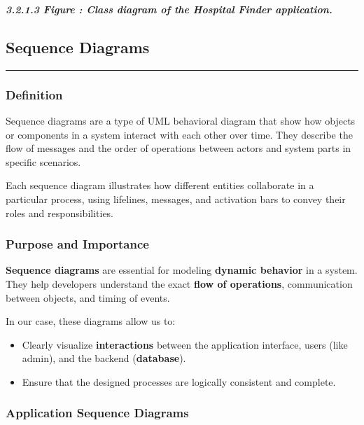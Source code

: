 \documentclass[12pt]{report}
\begin{document}
\vspace{0.5cm}
\begin{center}
	\textit{\textbf{3.2.1.3 Figure : Class diagram of the Hospital Finder application.}}

\end{center}
\vspace{0.5cm}
\subsection{Sequence Diagrams}
\vspace{-0.3cm}
\rule{7.2cm}{1.2pt}
\vspace{-0.3cm}

\subsubsection{Definition}
\vspace{0.1cm}

Sequence diagrams are a type of UML behavioral diagram that show how objects or components in a system interact with each other over time. They describe the flow of messages and the order of operations between actors and system parts in specific scenarios.

Each sequence diagram illustrates how different entities collaborate in a particular process, using lifelines, messages, and activation bars to convey their roles and responsibilities.

\subsubsection{Purpose and Importance}
\vspace{0.1cm}


\textbf{Sequence diagrams} are essential for modeling \textbf{dynamic behavior} in a system. They help developers understand the exact \textbf{flow of operations}, communication between objects, and timing of events.

In our case, these diagrams allow us to:
\begin{itemize}
	\item Clearly visualize \textbf{interactions} between the application interface, users (like admin), and the backend (\textbf{database}).
	\item Ensure that the designed processes are logically consistent and complete.
\end{itemize}


\subsubsection{Application Sequence Diagrams}
\vspace{0.1cm}
\end{document}
